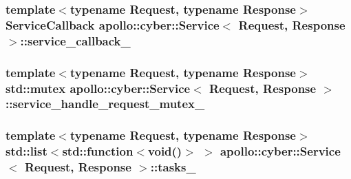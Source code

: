 \hypertarget{classapollo_1_1cyber_1_1Service_a1fa2cb859454bfc73299470e36648ed3}{
\subsubsection[{service\-\_\-callback\-\_\-}]{\setlength{\rightskip}{0pt plus 5cm}template$<$typename Request, typename Response$>$ {\bf Service\-Callback} {\bf apollo\-::cyber\-::\-Service}$<$ Request, Response $>$\-::service\-\_\-callback\-\_\-\hspace{0.3cm}{\ttfamily [private]}}}\label{classapollo_1_1cyber_1_1Service_a1fa2cb859454bfc73299470e36648ed3}
\hypertarget{classapollo_1_1cyber_1_1Service_a5c8fe530f3c6252b5ef3ec2c5e8e16be}{
\subsubsection[{service\-\_\-handle\-\_\-request\-\_\-mutex\-\_\-}]{\setlength{\rightskip}{0pt plus 5cm}template$<$typename Request, typename Response$>$ std\-::mutex {\bf apollo\-::cyber\-::\-Service}$<$ Request, Response $>$\-::service\-\_\-handle\-\_\-request\-\_\-mutex\-\_\-\hspace{0.3cm}{\ttfamily [private]}}}\label{classapollo_1_1cyber_1_1Service_a5c8fe530f3c6252b5ef3ec2c5e8e16be}
\hypertarget{classapollo_1_1cyber_1_1Service_a6e223d7b18757cfeeee1618df40f2649}{
\subsubsection[{tasks\-\_\-}]{\setlength{\rightskip}{0pt plus 5cm}template$<$typename Request, typename Response$>$ std\-::list$<$std\-::function$<$void()$>$ $>$ {\bf apollo\-::cyber\-::\-Service}$<$ Request, Response $>$\-::tasks\-\_\-\hspace{0.3cm}{\ttfamily [private]}}}\label{classapollo_1_1cyber_1_1Service_a6e223d7b18757cfeeee1618df40f2649}
